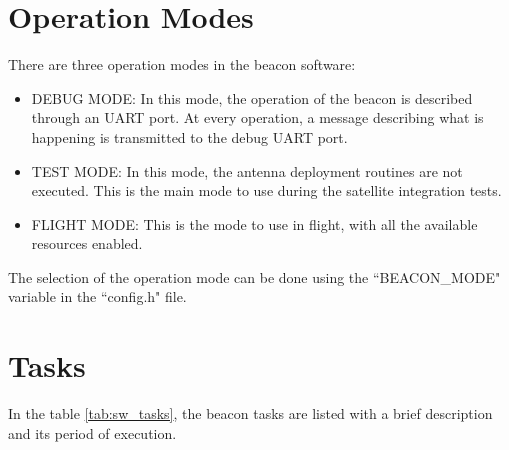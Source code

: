 \section{Operation Modes}

There are three operation modes in the beacon software:

\begin{itemize}
    \item DEBUG MODE: In this mode, the operation of the beacon is described through an UART port. At every operation, a message describing what is happening is transmitted to the debug UART port.
    \item TEST MODE: In this mode, the antenna deployment routines are not executed. This is the main mode to use during the satellite integration tests.
    \item FLIGHT MODE: This is the mode to use in flight, with all the available resources enabled.
\end{itemize}

The selection of the operation mode can be done using the ``BEACON\_MODE" variable in the ``config.h" file.

\section{Tasks}

In the table \ref{tab:sw_tasks}, the beacon tasks are listed with a brief description and its period of execution.

